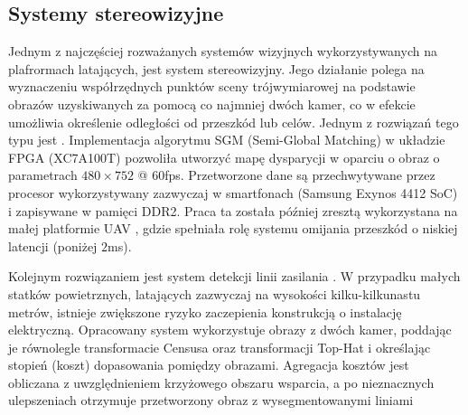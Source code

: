\subsection{Systemy stereowizyjne}
Jednym z najczęściej rozważanych systemów wizyjnych wykorzystywanych na plafrormach latających, jest system stereowizyjny. Jego działanie polega na wyznaczeniu współrzędnych punktów sceny trójwymiarowej na podstawie obrazów uzyskiwanych za pomocą co najmniej dwóch kamer, co w efekcie umożliwia określenie odległości od przeszkód lub celów. 
Jednym z rozwiązań tego typu jest \cite{STEREOVISION}. Implementacja algorytmu SGM (Semi-Global Matching) w układzie FPGA (XC7A100T) pozwoliła utworzyć mapę dysparycji w oparciu o obraz o parametrach $480\times 752$ @ $60$fps. Przetworzone dane są przechwytywane przez procesor wykorzystywany zazwyczaj w smartfonach (Samsung Exynos 4412 SoC) i zapisywane w pamięci DDR2. Praca ta została później zresztą wykorzystana na małej platformie UAV \cite{STEREOVISION2}, gdzie spełniała rolę systemu omijania przeszkód o niskiej latencji (poniżej $2$ms).

Kolejnym rozwiązaniem jest system detekcji linii zasilania \cite{STEREOVISION3}. W przypadku małych statków powietrznych, latających zazwyczaj na wysokości kilku-kilkunastu metrów, istnieje zwiększone ryzyko zaczepienia konstrukcją o instalację elektryczną. Opracowany system
wykorzystuje obrazy z dwóch kamer, poddając je równolegle transformacie Censusa oraz transformacji Top-Hat i określając stopień (koszt) dopasowania pomiędzy obrazami. Agregacja kosztów jest obliczana z uwzględnieniem krzyżowego obszaru wsparcia,%
a po nieznacznych ulepszeniach otrzymuje przetworzony obraz z wysegmentowanymi liniami